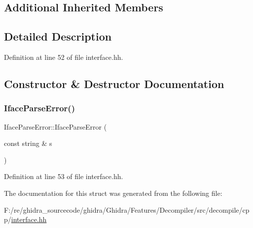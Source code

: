 \subsection*{Additional Inherited Members}


\subsection{Detailed Description}


Definition at line 52 of file interface.\+hh.



\subsection{Constructor \& Destructor Documentation}
\mbox{\label{struct_iface_parse_error_aceba1718d48f681465461f11e7108d75}} 
\subsubsection{\texorpdfstring{IfaceParseError()}{IfaceParseError()}}
{\footnotesize\ttfamily Iface\+Parse\+Error\+::\+Iface\+Parse\+Error (\begin{DoxyParamCaption}\item[{const string \&}]{s }\end{DoxyParamCaption})\hspace{0.3cm}{\ttfamily [inline]}}



Definition at line 53 of file interface.\+hh.



The documentation for this struct was generated from the following file\+:\begin{DoxyCompactItemize}
\item 
F\+:/re/ghidra\+\_\+sourcecode/ghidra/\+Ghidra/\+Features/\+Decompiler/src/decompile/cpp/\mbox{\hyperlink{interface_8hh}{interface.\+hh}}\end{DoxyCompactItemize}
